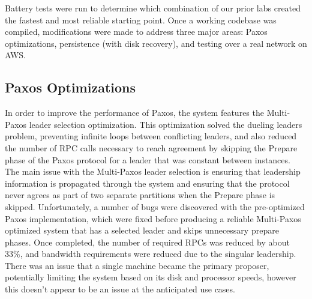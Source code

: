 \documentclass[letterpaper,10pt]{article}
\begin{document}
Battery tests were run to determine which combination of our prior labs created the fastest and most reliable starting point.  Once a working codebase was compiled, modifications were made to address three  major areas: Paxos optimizations, persistence (with disk recovery), and testing over a real network on AWS.

\subsection{Paxos Optimizations}
In order to improve the performance of Paxos, the system features the Multi-Paxos leader selection optimization. This optimization solved the dueling leaders problem, preventing infinite loops between conflicting leaders, and also reduced the number of RPC calls necessary to reach agreement by skipping the Prepare phase of the Paxos protocol for a leader that was constant between instances. The main issue with the Multi-Paxos leader selection is ensuring that leadership information is propagated through the system and ensuring that the protocol never agrees as part of two separate partitions when the Prepare phase is skipped. Unfortunately, a number of bugs were discovered with the pre-optimized Paxos implementation, which were fixed before producing a reliable Multi-Paxos optimized system that has a selected leader and skips unnecessary prepare phases.  Once completed, the number of required RPCs was reduced by about 33\%, and bandwidth requirements were reduced due to the singular leadership. There was an issue that a single machine became the primary proposer, potentially limiting the system based on its disk and processor speeds, however this doesn't appear to be an issue at the anticipated use cases.
\end{document}
